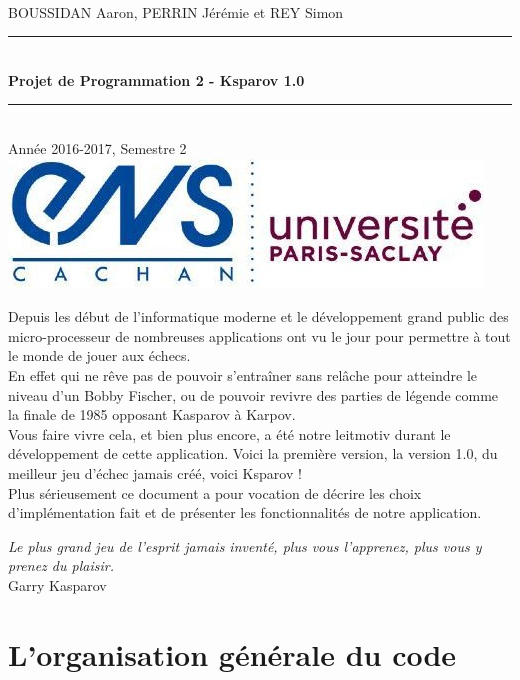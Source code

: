 \documentclass[a4paper]{article}
\newcommand{\HRule}{\rule{\linewidth}{0.5mm}}
\begin{document}
\begin{titlepage}
~\\
BOUSSIDAN Aaron, PERRIN Jérémie et REY Simon\\[5cm]
\begin{center}
\HRule
\\[0.4cm]{\huge\bfseries Projet de Programmation 2 - Ksparov 1.0\\[0.4cm]}
\HRule \\[0.5cm]
Année 2016-2017, Semestre 2\\[12cm]
\includegraphics[scale=0.7]{Images/Logo_ENS_PS.jpg}
\end{center}
\end{titlepage}

Depuis les début de l'informatique moderne et le développement grand public des micro-processeur de nombreuses applications ont vu le jour pour permettre à tout le monde de jouer aux échecs. \\

En effet qui ne rêve pas de pouvoir s'entraîner sans relâche pour atteindre le niveau d'un Bobby Fischer, ou de pouvoir revivre des parties de légende comme la finale de 1985 opposant Kasparov à Karpov. \\

Vous faire vivre cela, et bien plus encore, a été notre leitmotiv durant le développement de cette application. Voici la première version, la version 1.0, du meilleur jeu d'échec jamais créé, voici Ksparov ! \\

Plus sérieusement ce document a pour vocation de décrire les choix d'implémentation fait et de présenter les fonctionnalités de notre application. 

\begin{flushright}
\textit{Le plus grand jeu de l'esprit jamais inventé, plus vous l'apprenez, plus vous y prenez du plaisir.}\\

Garry Kasparov
\end{flushright}

\section{L'organisation générale du code}
\end{document}
